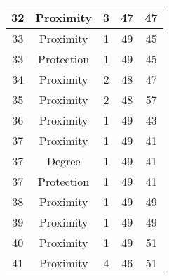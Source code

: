 \documentclass[results.tex]{subfiles}
\begin{document}
\begin{center}
\begin{tabular}{| c || c | c | c | c |}
            \hline
            32                      & Proximity                    & 3                      & 47                      & 47                   \\
            \hline
            33                      & Proximity                    & 1                      & 49                      & 45                   \\
            \hline
            33                      & Protection                   & 1                      & 49                      & 45                   \\
            \hline
            34                      & Proximity                    & 2                      & 48                      & 47                   \\
            \hline
            35                      & Proximity                    & 2                      & 48                      & 57                   \\
            \hline
            36                      & Proximity                    & 1                      & 49                      & 43                   \\
            \hline
            37                      & Proximity                    & 1                      & 49                      & 41                   \\
            \hline
            37                      & Degree                       & 1                      & 49                      & 41                   \\
            \hline
            37                      & Protection                   & 1                      & 49                      & 41                   \\
            \hline
            38                      & Proximity                    & 1                      & 49                      & 49                   \\
            \hline
            39                      & Proximity                    & 1                      & 49                      & 49                   \\
            \hline
            40                      & Proximity                    & 1                      & 49                      & 51                   \\
            \hline
            41                      & Proximity                    & 4                      & 46                      & 51                   \\

\end{tabular}
\end{center}
\end{document}
